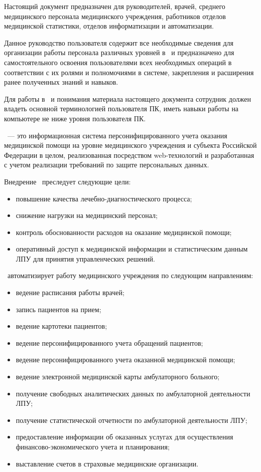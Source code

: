 \newpage
{}

 Настоящий документ предназначен для руководителей, врачей, среднего медицинского персонала медицинского учреждения, работников отделов медицинской статистики, отделов информатизации и автоматизации. 
 
 Данное руководство пользователя содержит все необходимые сведения для организации работы персонала различных уровней в \tmis~и предназначено для самостоятельного освоения пользователями всех необходимых операций в соответствии с их ролями и полномочиями в системе, закрепления и расширения ранее полученных знаний и навыков.

 Для работы в \tmis~и понимания материала настоящего документа сотрудник должен владеть основной терминологией пользователя ПК, иметь навыки работы на компьютере не ниже уровня пользователя ПК.

 \tmis~--- это информационная система персонифицированного учета оказания медицинской помощи на уровне медицинского учреждения и субъекта Российской Федерации в целом, реализованная посредством web-технологий и  разработанная с учетом реализации требований по защите персональных данных.

 Внедрение \tmis~преследует следующие цели:
\begin{itemize}
 	\item повышение качества лечебно-диагностического процесса;
 	\item снижение нагрузки на медицинский персонал;
 	\item контроль обоснованности расходов на оказание медицинской помощи;
 	\item оперативный доступ к медицинской информации и статистическим данным ЛПУ для принятия управленческих решений.
\end{itemize}

\tmis~автоматизирует работу медицинского учреждения по следующим направлениям:
\begin{itemize}
 	\item ведение расписания работы врачей;
 	\item запись пациентов на прием;
 	\item ведение картотеки пациентов;
 	\item ведение персонифицированного учета обращений пациентов;
 	\item ведение персонифицированного учета оказанной медицинской помощи;
 	\item ведение электронной медицинской карты амбулаторного больного;
    \item получение свободных аналитических данных по амбулаторной деятельности ЛПУ;
 	\item получение статистической отчетности по амбулаторной деятельности ЛПУ;
 	\item предоставление информации об оказанных услугах для осуществления финансово-экономического учета и планирования;
 	\item выставление счетов в страховые медицинские организации.
\end{itemize}

